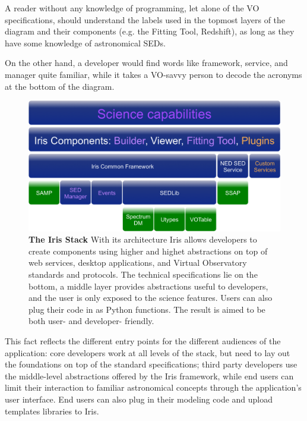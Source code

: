 \documentclass[5p]{elsarticle}
\begin{document}
A reader without any knowledge of programming, let alone of the VO specifications, should understand the labels used in the topmost layers of the diagram and their components (e.g. the Fitting Tool, Redshift), as long as they have some knowledge of astronomical SEDs.

On the other hand, a developer would find words like framework, service, and manager quite familiar, while it takes a VO-savvy person to decode the acronyms at the bottom of the diagram.

\begin{figure}
\label{fig:stack}
\begin{center}
\includegraphics[width=\columnwidth]{figures/IrisStack.png}
\caption{\textbf{The Iris Stack} With its architecture Iris allows developers to create components using higher and highet abstractions on top of web services, desktop applications, and Virtual Observatory standards and protocols. The technical specifications lie on the bottom, a middle layer provides abstractions useful to developers, and the user is only exposed to the science features. Users can also plug their code in as Python functions. The result is aimed to be both user- and developer- friendly.}
\end{center}
\end{figure}

This fact reflects the different entry points for the different audiences of the application: core developers work at all levels of the stack, but need to lay out the foundations on top of the standard specifications; third party developers use the middle-level abstractions offered by the Iris framework, while end users can limit their interaction to familiar astronomical concepts through the application's user interface. End users can also plug in their modeling code and upload templates libraries to Iris.
\end{document}
